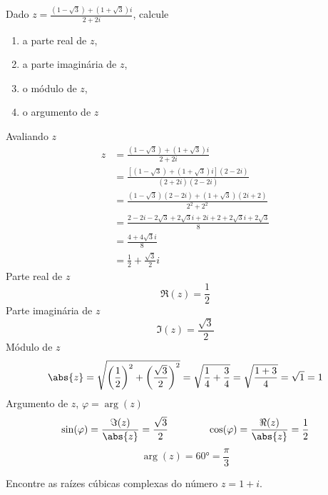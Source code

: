\documentclass[a4paper,12pt,fleqn]{article}
\begin{document}
Dado \(z=\frac{ \left(1-\sqrt{3}\right) + \left(1+\sqrt{3}\right)i}{2+2i} \), calcule
\begin{enumerate}[label=\alph*),itemsep=0pt]
  \item a parte real de $z$,
  \item a parte imaginária de $z$,
  \item o módulo de $z$,
  \item o argumento de $z$
\end{enumerate}

\begin{answer}
  Avaliando $z$
  \begin{align*}
    z
    & = \frac{ \left(1-\sqrt{3}\right) + \left(1+\sqrt{3}\right)i}{2+2i} \\[2mm]
    & = \frac{ \left[\left(1-\sqrt{3}\right) + \left(1+\sqrt{3}\right)i\right](2-2i)}{(2+2i)(2-2i)} \\[2mm]
    & = \frac{ \left(1-\sqrt{3}\right)(2-2i) + \left(1+\sqrt{3}\right)(2i+2)}{2^2 + 2^2} \\[2mm]
    & = \frac{ 2-2i-2\sqrt{3}+2\sqrt{3}i + 2i+2+2\sqrt{3}i +2\sqrt{3}}{8} \\[2mm]
    & = \frac{ 4 + 4\sqrt{3}i}{8} \\[2mm]
    & = \frac{1}{2} + \frac{\sqrt{3}}{2}i
  \end{align*}
  Parte real de $z$
  \[
    \Re(z) = \frac{1}{2}
  \]
  Parte imaginária de $z$
  \[
    \Im(z) = \frac{\sqrt{3}}{2}
  \]
  Módulo de $z$
  \[
    \abs{z}
    = \sqrt{\left(\frac{1}{2}\right)^2 + \left(\frac{\sqrt{3}}{2}\right)^2}
    = \sqrt{\frac{1}{4} + \frac{3}{4}}
    = \sqrt{\frac{1+3}{4}}
    = \sqrt{1}
    = 1
  \]
  Argumento de $z$, \(\varphi=\arg(z)\)
  \[
    \sin(\varphi)
    = \frac{\Im(z)}{\abs{z}}
    = \frac{\sqrt{3}}{2}
  \qquad\qquad
    \cos(\varphi)
    = \frac{\Re(z)}{\abs{z}}
    = \frac{1}{2}
  \]
  \[
    \arg(z)
    = \ang{60}
    = \frac{\pi}{3}
  \]
  \clearpage
\end{answer}

Encontre as raízes cúbicas complexas do número \( z = 1 + i \).
\end{document}
